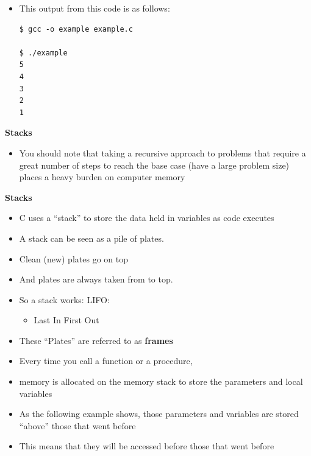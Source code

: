\documentclass{beamer}
\begin{document}
\begin{frame}[fragile]
\begin{itemize}
\item This output from this code is as follows:

\begin{block}{}
\begin{lstlisting}
$ gcc -o example example.c

$ ./example
5
4
3
2
1

\end{lstlisting}
\end{block}
\end{itemize}
\end{frame}

\begin{frame}
\textbf{Stacks}
\begin{itemize}
\item You should note that taking a recursive approach to problems that require a great number of steps to reach the base case (have a large problem size) places a heavy burden on computer memory
\end{itemize}
\end{frame}

\begin{frame}
\textbf{Stacks}
\begin{itemize}
\item C uses a ``stack'' to store the data held in variables as code executes 
\item A stack can be seen as a pile of plates. 
\item Clean (new) plates go on top 
\item And plates are always taken from to top. 
\item So a stack works: LIFO:
\begin{itemize}
\item Last In First Out 
\end{itemize}
\item These ``Plates'' are referred to as \textbf{frames}
\end{itemize}
\end{frame}

\begin{frame}
\begin{itemize}
\item Every time you call a function or a procedure, 
\item memory is allocated on the memory stack to store the parameters and local variables
\item As the following example shows, those parameters and variables are stored {}``above'' those that went before 
\item This means that they will be accessed before those that went before
\end{itemize}
\end{frame}
\end{document}
